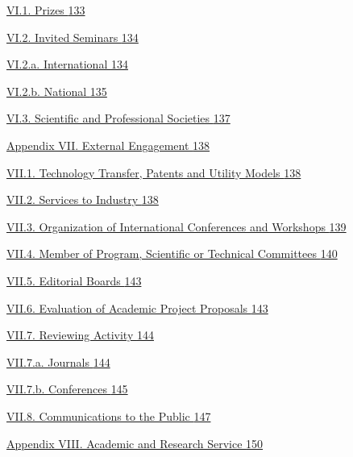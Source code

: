 \documentclass[
]{article}
\begin{document}
\hyperref[prizes]{VI.1. Prizes \hyperref[prizes]{133}}

\hyperref[invited-seminars]{VI.2. Invited Seminars
\hyperref[invited-seminars]{134}}

\hyperref[international]{VI.2.a. International
\hyperref[international]{134}}

\hyperref[national]{VI.2.b. National \hyperref[national]{135}}

\hyperref[scientific-and-professional-societies]{VI.3. Scientific and
Professional Societies
\hyperref[scientific-and-professional-societies]{137}}

\hyperref[external-engagement-1]{Appendix VII. External Engagement
\hyperref[external-engagement-1]{138}}

\hyperref[technology-transfer-patents-and-utility-models]{VII.1.
Technology Transfer, Patents and Utility Models
\hyperref[technology-transfer-patents-and-utility-models]{138}}

\hyperref[services-to-industry]{VII.2. Services to Industry
\hyperref[services-to-industry]{138}}

\hyperref[organization-of-international-conferences-and-workshops]{VII.3.
Organization of International Conferences and Workshops
\hyperref[organization-of-international-conferences-and-workshops]{139}}

\hyperref[member-of-program-scientific-or-technical-committees]{VII.4.
Member of Program, Scientific or Technical Committees
\hyperref[member-of-program-scientific-or-technical-committees]{140}}

\hyperref[editorial-boards]{VII.5. Editorial Boards
\hyperref[editorial-boards]{143}}

\hyperref[evaluation-of-academic-project-proposals]{VII.6. Evaluation of
Academic Project Proposals
\hyperref[evaluation-of-academic-project-proposals]{143}}

\hyperref[reviewing-activity]{VII.7. Reviewing Activity
\hyperref[reviewing-activity]{144}}

\hyperref[journals]{VII.7.a. Journals \hyperref[journals]{144}}

\hyperref[conferences]{VII.7.b. Conferences \hyperref[conferences]{145}}

\hyperref[communications-to-the-public]{VII.8. Communications to the
Public \hyperref[communications-to-the-public]{147}}

\hyperref[academic-and-research-service-1]{Appendix VIII. Academic and
Research Service \hyperref[academic-and-research-service-1]{150}}
\end{document}
